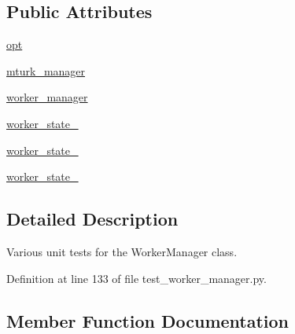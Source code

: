 \subsection*{Public Attributes}
\begin{DoxyCompactItemize}
\item 
\hyperlink{classparlai_1_1mturk_1_1core_1_1dev_1_1test_1_1test__worker__manager_1_1TestWorkerManager_a079143d302b581f5215cace52d6e30ad}{opt}
\item 
\hyperlink{classparlai_1_1mturk_1_1core_1_1dev_1_1test_1_1test__worker__manager_1_1TestWorkerManager_aed8e74630b4e4f95f00599e4cfc3058c}{mturk\+\_\+manager}
\item 
\hyperlink{classparlai_1_1mturk_1_1core_1_1dev_1_1test_1_1test__worker__manager_1_1TestWorkerManager_aa72feb8d0d0bed3ff27b9904e052a616}{worker\+\_\+manager}
\item 
\hyperlink{classparlai_1_1mturk_1_1core_1_1dev_1_1test_1_1test__worker__manager_1_1TestWorkerManager_ac79288937dd4b40b9ba662d3d03cfbaf}{worker\+\_\+state\+\_}
\item 
\hyperlink{classparlai_1_1mturk_1_1core_1_1dev_1_1test_1_1test__worker__manager_1_1TestWorkerManager_adb3ccb63bde0ca48296d444bcd9a507b}{worker\+\_\+state\+\_}
\item 
\hyperlink{classparlai_1_1mturk_1_1core_1_1dev_1_1test_1_1test__worker__manager_1_1TestWorkerManager_a39dccdaf12fba31599b29334ecf81ce3}{worker\+\_\+state\+\_}
\end{DoxyCompactItemize}


\subsection{Detailed Description}
\begin{DoxyVerb}Various unit tests for the WorkerManager class.
\end{DoxyVerb}
 

Definition at line 133 of file test\+\_\+worker\+\_\+manager.\+py.



\subsection{Member Function Documentation}
\mbox{\label{classparlai_1_1mturk_1_1core_1_1dev_1_1test_1_1test__worker__manager_1_1TestWorkerManager_a686dafeb3df50fdcd77271647d81dcd4}} 
